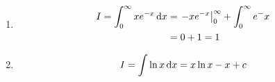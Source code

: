\documentclass{article}
\begin{document}
\begin{eg}\leavevmode
    \begin{enumerate}
        \item \begin{align*}
            I = \int_{0}^{\infty}{xe^{-x} \mathop{}\!\mathrm{d} x} &= \left. -xe^{-x} \right\rvert_{0}^{\infty} + \int_{0}^{\infty}{e^-x} \\
            &= 0 + 1 = 1
        \end{align*}
        \item \[
            I = \int{\ln{x} \mathop{}\!\mathrm{d}x} = x\ln{x} - x + c    
        \]
    \end{enumerate}
\end{eg}

\end{document}
